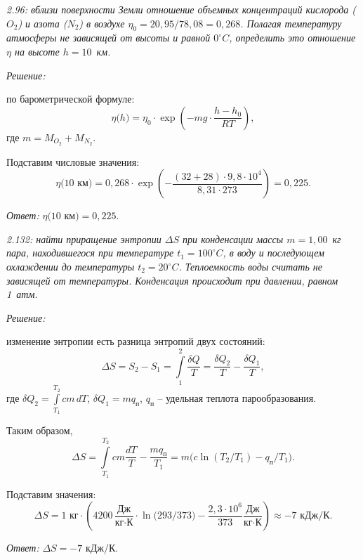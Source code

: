 \documentclass[pscyr]{hedwork}
\begin{document}
\newpage %

\emph{2.96: вблизи поверхности Земли отношение объемных концентраций кислорода
(\( O_2 \)) и азота (\( N_2 \)) в воздухе \( \eta_0 = 20,\!95/78,\!08 =
0,\!268 \). Полагая температуру атмосферы не зависящей от высоты и равной
\( 0^\circ C \), определить это отношение \( \eta \) на высоте \( h = 10 \)~км.}

\vspace*{2em}
\emph{Решение:}

по барометрической формуле:
\[
  \eta\big(h\big) = \eta_0\cdot\exp\left(-mg\cdot\frac{h - h_0}{RT}\right),
\]
где \( m = M_{O_2} + M_{N_2} \).

Подставим числовые значения:
\[
  \eta\big(10\text{ км}\big) = 0,\!268\cdot\exp\left(-\frac{(32 + 28)\cdot
  9,\!8\cdot10^{4}}{8,\!31\cdot273}\right) = 0,\!225.
\]

\vspace*{2em}
\emph{Ответ:} \( \eta\big(10\text{ км}\big) = 0,\!225 \).

\newpage %

\emph{2.132: найти приращение энтропии \( \Delta S \) при конденсации массы
\( m = 1,\!00 \)~кг пара, находившегося при температуре \( t_1 = 100^\circ C \),
в воду и последующем охлаждении до температуры \( t_2 = 20^\circ C \).
Теплоемкость воды считать не зависящей от температуры. Конденсация происходит
при давлении, равном 1~атм.}

\vspace*{2em}
\emph{Решение:}

изменение энтропии есть разница энтропий двух состояний:
\[
  \Delta S = S_2 - S_1 = \int\limits_1^2 \frac{\delta Q}{T} =
  \frac{\delta Q_2}{T} - \frac{\delta Q_1}{T},
\]
где \( \displaystyle \delta Q_2 = \int\limits_{T_1}^{T_2} cm\,dT \), \quad
\( \delta Q_1 = mq_\text{п} \), \( q_\text{п} \) -- удельная теплота
парообразования.

Таким образом,
\[
  \Delta S = \int\limits_{T_1}^{T_2} cm\frac{dT}{T} - \frac{mq_\text{п}}{T_1} =
  m\big(c\ln(T_2/T_1) - q_\text{п}/T_1\big).
\]

Подставим значения:
\[
  \Delta S = 1\text{ кг}\cdot
  \left( 4200\,\frac{\text{Дж}}{\text{кг}\cdot\text{К}} \cdot
  \ln\big( 293/373 \big) - \frac{2,\!3\cdot 10^6}{373}
  \frac{\text{Дж}}{\text{кг}\cdot\text{К}} \right)
  \approx -7 \text{ кДж}/\text{К}.
\]

\vspace*{2em}
\emph{Ответ:} \( \Delta S = -7 \) кДж/К.
\end{document}
